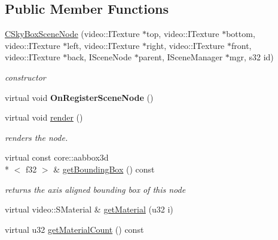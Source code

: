 \subsection*{Public Member Functions}
\begin{DoxyCompactItemize}
\item 
\hypertarget{classirr_1_1scene_1_1_c_sky_box_scene_node_abd737ec7f15784b30cb4231e18ef44e1}{\hyperlink{classirr_1_1scene_1_1_c_sky_box_scene_node_abd737ec7f15784b30cb4231e18ef44e1}{C\-Sky\-Box\-Scene\-Node} (video\-::\-I\-Texture $\ast$top, video\-::\-I\-Texture $\ast$bottom, video\-::\-I\-Texture $\ast$left, video\-::\-I\-Texture $\ast$right, video\-::\-I\-Texture $\ast$front, video\-::\-I\-Texture $\ast$back, I\-Scene\-Node $\ast$parent, I\-Scene\-Manager $\ast$mgr, s32 id)}\label{classirr_1_1scene_1_1_c_sky_box_scene_node_abd737ec7f15784b30cb4231e18ef44e1}

\begin{DoxyCompactList}\small\item\em constructor \end{DoxyCompactList}\item 
\hypertarget{classirr_1_1scene_1_1_c_sky_box_scene_node_a46d2e7c7d688dfc860b9e3f80c5691ea}{virtual void {\bfseries On\-Register\-Scene\-Node} ()}\label{classirr_1_1scene_1_1_c_sky_box_scene_node_a46d2e7c7d688dfc860b9e3f80c5691ea}

\item 
\hypertarget{classirr_1_1scene_1_1_c_sky_box_scene_node_a7a8681d1876ddcb97ff0e2cff3624584}{virtual void \hyperlink{classirr_1_1scene_1_1_c_sky_box_scene_node_a7a8681d1876ddcb97ff0e2cff3624584}{render} ()}\label{classirr_1_1scene_1_1_c_sky_box_scene_node_a7a8681d1876ddcb97ff0e2cff3624584}

\begin{DoxyCompactList}\small\item\em renders the node. \end{DoxyCompactList}\item 
\hypertarget{classirr_1_1scene_1_1_c_sky_box_scene_node_a704a64dd2fc22418d21173b75e1d80e4}{virtual const core\-::aabbox3d\\*
$<$ f32 $>$ \& \hyperlink{classirr_1_1scene_1_1_c_sky_box_scene_node_a704a64dd2fc22418d21173b75e1d80e4}{get\-Bounding\-Box} () const }\label{classirr_1_1scene_1_1_c_sky_box_scene_node_a704a64dd2fc22418d21173b75e1d80e4}

\begin{DoxyCompactList}\small\item\em returns the axis aligned bounding box of this node \end{DoxyCompactList}\item 
virtual video\-::\-S\-Material \& \hyperlink{classirr_1_1scene_1_1_c_sky_box_scene_node_a449f281b5319df69c5700f1475f1ca33}{get\-Material} (u32 i)
\item 
\hypertarget{classirr_1_1scene_1_1_c_sky_box_scene_node_ab6e9542c7da9982018f99138a3be4da0}{virtual u32 \hyperlink{classirr_1_1scene_1_1_c_sky_box_scene_node_ab6e9542c7da9982018f99138a3be4da0}{get\-Material\-Count} () const }\label{classirr_1_1scene_1_1_c_sky_box_scene_node_ab6e9542c7da9982018f99138a3be4da0}


\end{DoxyCompactItemize}
